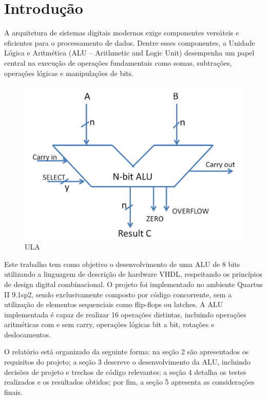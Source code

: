 \section{Introdução}

A arquitetura de sistemas digitais modernos exige componentes versáteis e eficientes para o processamento de dados. Dentre esses componentes, a Unidade Lógica e Aritmética (ALU – Arithmetic and Logic Unit) desempenha um papel central na execução de operações fundamentais como somas, subtrações, operações lógicas e manipulações de bits.

\begin{figure}[H]
    \centering
    \includegraphics[width=\textwidth]{images/alu.png}
    \caption{ULA}
\end{figure}

Este trabalho tem como objetivo o desenvolvimento de uma ALU de 8 bits utilizando a linguagem de descrição de hardware VHDL, respeitando os princípios de design digital combinacional. O projeto foi implementado no ambiente Quartus II 9.1sp2, sendo exclusivamente composto por código concorrente, sem a utilização de elementos sequenciais como flip-flops ou latches. A ALU implementada é capaz de realizar 16 operações distintas, incluindo operações aritméticas com e sem carry, operações lógicas bit a bit, rotações e deslocamentos.

O relatório está organizado da seguinte forma: na seção 2 são apresentados os requisitos do projeto; a seção 3 descreve o desenvolvimento da ALU, incluindo decisões de projeto e trechos de código relevantes; a seção 4 detalha os testes realizados e os resultados obtidos; por fim, a seção 5 apresenta as considerações finais.